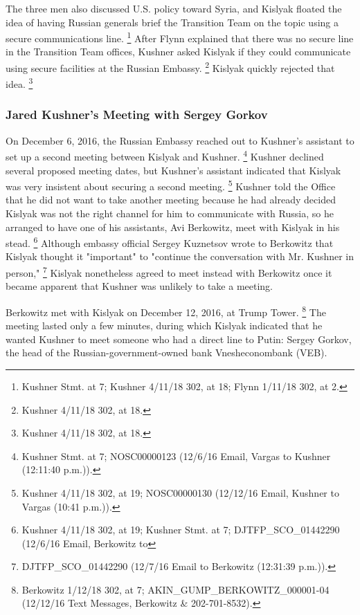 The three men also discussed U.S. policy toward Syria, and Kislyak floated the idea of having Russian generals brief the Transition Team on the topic using a secure communications line.%
\footnote{Kushner Stmt. at 7;
Kushner 4/11/18 302, at 18;
Flynn 1/11/18 302, at 2.}
After Flynn explained that there was no secure line in the Transition Team offices, Kushner asked Kislyak if they could communicate using secure facilities at the Russian Embassy.%
\footnote{Kushner 4/11/18 302, at 18.}
Kislyak quickly rejected that idea.%
\footnote{Kushner 4/11/18 302, at 18.}

\subsubsection{Jared Kushner's Meeting with Sergey Gorkov}

On December 6, 2016, the Russian Embassy reached out to Kushner's assistant to set up a second meeting between Kislyak and Kushner.%
\footnote{Kushner Stmt. at 7;
NOSC00000123 (12/6/16 Email, Vargas to Kushner (12:11:40 p.m.)).}
Kushner declined several proposed meeting dates, but Kushner's assistant indicated that Kislyak was very insistent about securing a second meeting.%
\footnote{Kushner 4/11/18 302, at 19;
NOSC00000130 (12/12/16 Email, Kushner to Vargas (10:41 p.m.)).}
Kushner told the Office that he did not want to take another meeting because he had already decided Kislyak was not the right channel for him to communicate with Russia, so he arranged to have one of his assistants, Avi Berkowitz, meet with Kislyak in his stead.%
\footnote{Kushner 4/11/18 302, at 19;
Kushner Stmt. at 7;
DJTFP\_SCO\_01442290 (12/6/16 Email, Berkowitz to }
Although embassy official Sergey Kuznetsov wrote to Berkowitz that Kislyak thought it "important" to "continue the conversation with Mr. Kushner in person,"%
\footnote{DJTFP\_SCO\_01442290 (12/7/16 Email  to Berkowitz (12:31:39 p.m.)).}
Kislyak nonetheless agreed to meet instead with Berkowitz once it became apparent that Kushner was unlikely to take a meeting.

Berkowitz met with Kislyak on December 12, 2016, at Trump Tower.%
\footnote{Berkowitz 1/12/18 302, at 7;
AKIN\_GUMP\_BERKOWITZ\_000001-04 (12/12/16 Text Messages, Berkowitz \& 202-701-8532).}
The meeting lasted only a few minutes, during which Kislyak indicated that he wanted Kushner to meet someone who had a direct line to Putin: Sergey Gorkov, the head of the Russian-government-owned bank Vnesheconombank (VEB).


